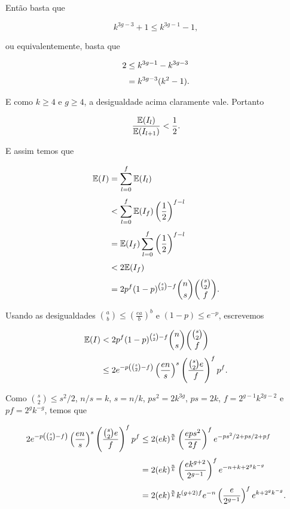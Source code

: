 Então basta que

\[k^{3g-3}+1 \leq k^{3g-1}-1,\]

ou equivalentemente, basta que

\begin{equation*}
\setlength{\jot}{6pt}
\begin{aligned}
2 &\leq k^{3g-1} - k^{3g-3} \\
&= k^{3g-3}(k^2 - 1).
\end{aligned}
\end{equation*}

E como $k \geq 4$ e $g \geq 4$, a desigualdade acima claramente vale. Portanto

\[\frac{\mathbb{E}(I_l)}{\mathbb{E}(I_{l+1})} < \frac{1}{2}.\]

E assim temos que

\begin{equation*}
\setlength{\jot}{6pt}
\begin{aligned}
\bbe(I) &= \sum\limits_{l=0}^{f}\bbe(I_l) \\
&< \sum\limits_{l=0}^{f} \bbe(I_f)\left(\frac{1}{2}\right)^{f-l} \\
&= \bbe(I_f)\sum\limits_{l=0}^{f} \left(\frac{1}{2}\right)^{f-l} \\
&< 2\bbe(I_f) \\
&= 2p^f(1-p)^{\binom{s}{2}-f}\binom{n}{s}\binom{\binom{s}{2}}{f}.
\end{aligned}
\end{equation*}

Usando as desigualdades $\binom{a}{b} \leq \left(\frac{ea}{b}\right)^b$ e  $(1-p) \leq e^{-p}$, escrevemos

\begin{equation*}
\setlength{\jot}{6pt}
\begin{aligned}
\bbe(I) &< 2p^f(1-p)^{\binom{s}{2}-f}\binom{n}{s}\binom{\binom{s}{2}}{f} \\
&\leq 2e^{-p\left(\binom{s}{2}-f\right)}\left(\frac{en}{s}\right)^s\left(\frac{\binom{s}{2}e}{f}\right)^f p^f.
\end{aligned}
\end{equation*}

Como $\binom{s}{2} \leq s^2/2$, $n/s = k$, $s = n/k$, $ps^2 = 2k^{3g}$, $ps = 2k$, $f = 2^{g-1}k^{2g-2}$ e $pf = 2^g k^{-g}$, temos que

\begin{equation*}
\setlength{\jot}{6pt}
\begin{aligned}
2e^{-p\left(\binom{s}{2}-f\right)}\left(\frac{en}{s}\right)^s\left(\frac{\binom{s}{2}e}{f}\right)^f p^f &\leq 2(ek)^{\frac{n}{k}}\left(\frac{eps^2}{2f}\right)^f e^{-ps^2/2+ps/2+pf} \\
&= 2(ek)^{\frac{n}{k}} \left(\frac{ek^{g+2}}{2^{g-1}}\right)^f e^{-n+k+2^{g}k^{-g}} \\
&= 2(ek)^{\frac{n}{k}} k^{(g+2)f} e^{-n} \left(\frac{e}{2^{g-1}}\right)^f e^{k+2^g k^{-g}}.
\end{aligned}
\end{equation*}

